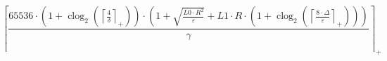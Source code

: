 \[\left\lceil \frac{65536 \cdot \left(1 + \operatorname{clog}_{2}\left(\left\lceil \frac{4}{\delta} \right\rceil_{+}\right)\right) \cdot \left(1 + \sqrt{\frac{L0 \cdot R^{2}}{\varepsilon}} + L1 \cdot R \cdot \left(1 + \operatorname{clog}_{2}\left(\left\lceil \frac{8 \cdot \Delta}{\varepsilon} \right\rceil_{+}\right)\right)\right)}{\gamma} \right\rceil_{+}\]
